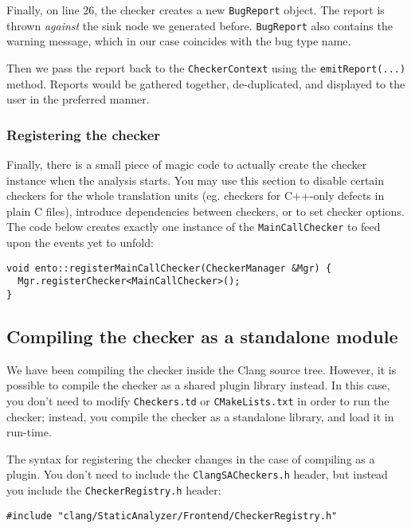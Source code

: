\documentclass[a4paper,12pt]{article}
\newenvironment{nobr}{\begin{minipage}{\textwidth}\setlength\parskip{1em}
}{\end{minipage}\ignorespacesafterend}
\begin{document}
Finally, on line 26, the checker creates a new \lstinline|BugReport| object. The report is thrown \emph{against} the sink node we generated before. \lstinline|BugReport| also contains the warning message, which in our case coincides with the bug type name.

Then we pass the report back to the \lstinline|CheckerContext| using the \lstinline|emitReport(...)| method. Reports would be gathered together, de-duplicated, and displayed to the user in the preferred manner.

\begin{nobr}
\subsubsection{Registering the checker}

Finally, there is a small piece of magic code to actually create the checker instance when the analysis starts. You may use this section to disable certain checkers for the whole translation units (eg. checkers  for C++-only defects in plain C files), introduce dependencies between checkers, or to set checker options. The code below creates exactly one instance of the \lstinline|MainCallChecker| to feed upon the events yet to unfold:

\begin{lstlisting}[style=cplusplus,firstnumber=31]
void ento::registerMainCallChecker(CheckerManager &Mgr) {
  Mgr.registerChecker<MainCallChecker>();
}
\end{lstlisting}
\end{nobr}

\begin{nobr}
\subsection{Compiling the checker as a standalone module}

We have been compiling the checker inside the Clang source tree. However, it is possible to compile the checker as a shared plugin library instead. In this case, you don't need to modify \lstinline|Checkers.td| or \lstinline|CMakeLists.txt| in order to run the checker; instead, you compile the checker as a standalone library, and load it in run-time.
\end{nobr}

\begin{nobr}
The syntax for registering the checker changes in the case of compiling as a plugin. You don't need to include the \lstinline|ClangSACheckers.h| header, but instead you include the \lstinline|CheckerRegistry.h| header:
\begin{lstlisting}[style=cplusplus,numbers=none]
#include "clang/StaticAnalyzer/Frontend/CheckerRegistry.h"
\end{lstlisting}
\end{nobr}
\end{document}

